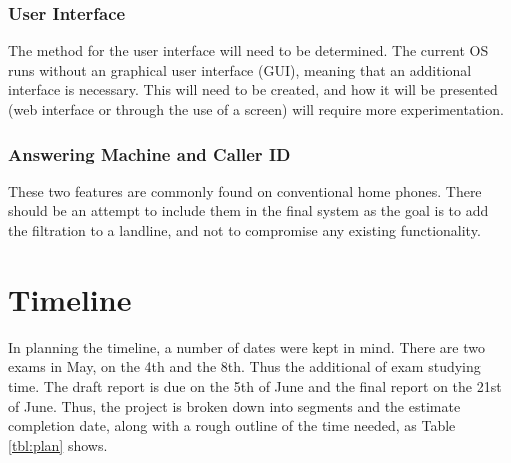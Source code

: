 \documentclass[12pt,a4paper]{report}
\begin{document}
\subsubsection{User Interface}
The method for the user interface will need to be determined. The current OS runs without an graphical user interface (GUI), meaning that an additional interface is necessary. This will need to be created, and how it will be presented (web interface or through the use of a screen) will require more experimentation.

\subsubsection{Answering Machine and Caller ID}
These two features are commonly found on conventional home phones. There should be an attempt to include them in the final system as the goal is to add the filtration to a landline, and not to compromise any existing functionality.

\section{Timeline}
In planning the timeline, a number of dates were kept in mind. There are two exams in May, on the 4th and the 8th. Thus the additional of exam studying time. The draft report is due on the 5th of June and the final report on the 21st of June. Thus, the project is broken down into segments and the estimate completion date, along with a rough outline of the time needed, as Table \ref{tbl:plan} shows.
\end{document}
